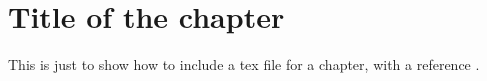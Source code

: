 \chapter{Title of the chapter}
This is just to show how to include a tex file for a chapter, with a reference \citep{ledesma_scree_2015}.
